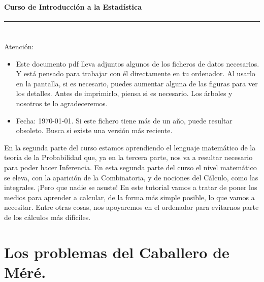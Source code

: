 \documentclass[10pt,a4paper]{article}\usepackage[]{graphicx}\usepackage[]{color}
\newcounter {cont01}
\begin{document}

\paragraph{\hspace{6.3cm}Curso de Introducción a la Estadística\\[2mm]} \noindent\hrule

\setcounter{section}{0}
\section*{\hspace{-0.1cm}}
{
Atención:
\begin{itemize}
  \item Este documento pdf lleva adjuntos algunos de los ficheros de datos necesarios. Y está pensado para trabajar con él directamente en tu ordenador. Al usarlo en la pantalla, si es necesario, puedes aumentar alguna de las figuras para ver los detalles. Antes de imprimirlo, piensa si es necesario. Los árboles y nosotros te lo agradeceremos.
  \item Fecha: \today. Si este fichero tiene más de un año, puede resultar obsoleto. Busca si existe una versión más reciente.
\end{itemize}
}
\setcounter{tocdepth}{1}
\tableofcontents

\noindent{\bf \\
}

En la segunda parte del curso estamos aprendiendo el lenguaje matemático de la teoría de la Probabilidad que, ya en la tercera parte, nos va a resultar necesario para poder hacer Inferencia. En esta segunda parte del curso el nivel matemático se eleva, con la aparición de la Combinatoria, y de nociones del Cálculo, como las integrales. ¡Pero que nadie se asuste! En este tutorial vamos a tratar de poner los medios para aprender a calcular, de la forma más simple posible, lo que vamos a necesitar. Entre otras cosas, nos apoyaremos en el ordenador para evitarnos parte de los cálculos más difíciles.


\section{Los problemas del Caballero de Méré.}
\label{tut03:sec:NumerosAleatoriosRSample}
\end{document}
